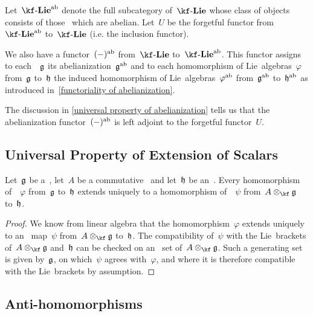 \begin{remark}
	Let~$\cLieab{\kf}$ denote the full subcategory of~$\cLie{\kf}$ whose class of objects consists of those~\liealgebras{$\kf$} which are abelian.
	Let~$U$ be the forgetful functor from~$\cLieab{\kf}$ to~$\cLie{\kf}$ (i.e. the inclusion functor).

	We also have a functor~$(-)^{\mathrm{ab}}$ from~$\cLie{\kf}$ to~$\cLieab{\kf}$.
	This functor assigns to each~\liealgebra{$\kf$}~$\mathfrak{g}$ its abelianization~$\mathfrak{g}^{\mathrm{ab}}$ and to each homomorphism of Lie~algebras~$\varphi$ from~$\mathfrak{g}$ to~$\mathfrak{h}$ the induced homomorphism of Lie~algebras~$\varphi^{\mathrm{ab}}$ from~$\mathfrak{g}^{\mathrm{ab}}$ to~$\mathfrak{h}^{\mathrm{ab}}$ as introduced in~\cref{functoriality of abelianization}.

	The discussion in \cref{universal property of abelianization} tells us that the abelianization functor~$(-)^{\mathrm{ab}}$ is left adjoint to the forgetful functor~$U$.
\end{remark}


\subsection{Universal Property of Extension of Scalars}


\begin{proposition}
	Let~$\mathfrak{g}$ be a~\liealgebra{$\kf$}, let~$A$ be a commutative~\algebra{$\kf$} and let~$\mathfrak{h}$ be an~.
	Every homomorphism of~\liealgebras{$\kf$}~$\varphi$ from~$\mathfrak{g}$ to~$\mathfrak{h}$ extends uniquely to a homomorphism of~~$\psi$ from~$A \tensor_{\kf} \glie$ to~$\mathfrak{h}$.
\end{proposition}


\begin{proof}
	We know from linear algebra that the homomorphism~$\varphi$ extends uniquely to an~ map~$\psi$ from~$A \tensor_{\kf} \glie$ to~$\mathfrak{h}$.
	The compatibility of~$\psi$ with the Lie~brackets of~$A \tensor_{\kf} \glie$ and~$\mathfrak{h}$ can be checked on an~ set of~$A \tensor_{\kf} \glie$.
	Such a generating set is given by~$\mathfrak{g}$, on which~$\psi$ agrees with~$\varphi$, and where it is therefore compatible with the Lie~brackets by assumption.
\end{proof}


\subsection{Anti-homomorphisms}


